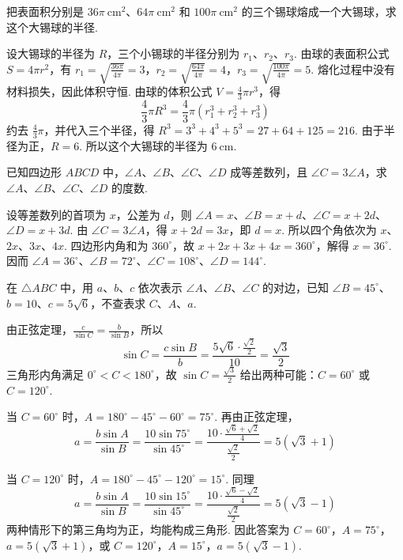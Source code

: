 \begin{problem}
把表面积分别是 \(36\pi\mathrm{~cm}^2\)、\(64\pi\mathrm{~cm}^2\) 和 \(100\pi\mathrm{~cm}^2\) 的三个锡球熔成一个大锡球，求这个大锡球的半径.
\end{problem}

\begin{solution}
设大锡球的半径为 \(R\)，三个小锡球的半径分别为 \(r_1\)、\(r_2\)、\(r_3\). 由球的表面积公式 \(S=4\pi r^2\)，有
\(r_1=\sqrt{\frac{36\pi}{4\pi}}=3\)，\(r_2=\sqrt{\frac{64\pi}{4\pi}}=4\)，\(r_3=\sqrt{\frac{100\pi}{4\pi}}=5\).
熔化过程中没有材料损失，因此体积守恒. 由球的体积公式 \(V=\frac43\pi r^3\)，得
\[
\frac43\pi R^3=\frac43\pi\left(r_1^3+r_2^3+r_3^3\right)
\]
约去 \(\frac43\pi\)，并代入三个半径，得
\(R^3=3^3+4^3+5^3=27+64+125=216\). 由于半径为正，\(R=6\). 所以这个大锡球的半径为 \(6\mathrm{~cm}\).
\end{solution}

\begin{problem}
已知四边形 \(ABCD\) 中，\(\angle A\)、\(\angle B\)、\(\angle C\)、\(\angle D\) 成等差数列，且 \(\angle C=3\angle A\)，求 \(\angle A\)、\(\angle B\)、\(\angle C\)、\(\angle D\) 的度数.
\end{problem}

\begin{solution}
设等差数列的首项为 \(x\)，公差为 \(d\)，则
\(\angle A=x\)、\(\angle B=x+d\)、\(\angle C=x+2d\)、\(\angle D=x+3d\). 由 \(\angle C=3\angle A\)，得 \(x+2d=3x\)，即 \(d=x\). 所以四个角依次为 \(x\)、\(2x\)、\(3x\)、\(4x\). 四边形内角和为 \(360^\circ\)，故
\(x+2x+3x+4x=360^\circ\)，解得 \(x=36^\circ\). 因而
\(\angle A=36^\circ\)、\(\angle B=72^\circ\)、\(\angle C=108^\circ\)、\(\angle D=144^\circ\).
\end{solution}

\begin{problem}
在 \(\triangle ABC\) 中，用 \(a\)、\(b\)、\(c\) 依次表示 \(\angle A\)、\(\angle B\)、\(\angle C\) 的对边，已知 \(\angle B=45^\circ\)、\(b=10\)、\(c=5\sqrt6\)，不查表求 \(C\)、\(A\)、\(a\).
\end{problem}

\begin{solution}
由正弦定理，\(\frac{c}{\sin C}=\frac{b}{\sin B}\)，所以
\[
\sin C=\frac{c\sin B}{b}
=\frac{5\sqrt6\cdot\frac{\sqrt2}{2}}{10}
=\frac{\sqrt3}{2}
\]
三角形内角满足 \(0^\circ<C<180^\circ\)，故 \(\sin C=\frac{\sqrt3}{2}\) 给出两种可能：\(C=60^\circ\) 或 \(C=120^\circ\).

当 \(C=60^\circ\) 时，\(A=180^\circ-45^\circ-60^\circ=75^\circ\). 再由正弦定理，
\[
a=\frac{b\sin A}{\sin B}
=\frac{10\sin75^\circ}{\sin45^\circ}
=\frac{10\cdot\frac{\sqrt6+\sqrt2}{4}}{\frac{\sqrt2}{2}}
=5(\sqrt3+1)
\]

当 \(C=120^\circ\) 时，\(A=180^\circ-45^\circ-120^\circ=15^\circ\). 同理
\[
a=\frac{b\sin A}{\sin B}
=\frac{10\sin15^\circ}{\sin45^\circ}
=\frac{10\cdot\frac{\sqrt6-\sqrt2}{4}}{\frac{\sqrt2}{2}}
=5(\sqrt3-1)
\]
两种情形下的第三角均为正，均能构成三角形. 因此答案为
\(C=60^\circ\)，\(A=75^\circ\)，\(a=5(\sqrt3+1)\)，或
\(C=120^\circ\)，\(A=15^\circ\)，\(a=5(\sqrt3-1)\).
\end{solution}


